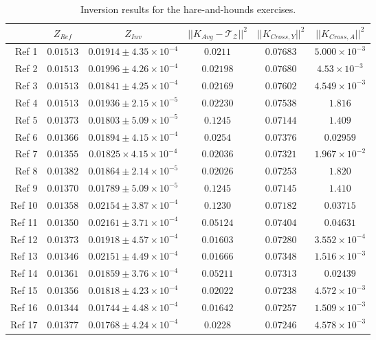 \documentclass[a4paper,fleqn,usenatbib]{mnras}
\begin{document}
\begin{table*}
\caption{Inversion results for the hare-and-hounds exercises.}
\label{tabResInvHH}
  \centering
\begin{tabular}{r | c | c | c | c | c}
\hline
& $Z_{Ref}$  & $Z_{Inv}$ & $\vert \vert K_{Avg}-\mathcal{T}_{\mathcal{Z}} \vert \vert^{2}$ & $\vert \vert K_{Cross,Y} \vert \vert^{2}$ & $\vert \vert K_{Cross,A} \vert \vert^{2}$ \\ \hline
Ref 1 & $0.01513$ & $0.01914\pm 4.35 \times 10^{-4}$ & $0.0211$ & $0.07683$ & $5.000\times 10^{-3}$\\  
Ref 2 & $0.01513$&  $0.01996\pm 4.26 \times 10^{-4}$ & $0.02198$& $0.07680$& $4.53\times 10^{-3}$\\  
Ref 3 & $0.01513$& $0.01841\pm 4.25 \times 10^{-4}$ & $0.02169$& $0.07602$ & $4.549 \times 10^{-3}$ \\
Ref 4 & $0.01513$ & $0.01936 \pm 2.15 \times 10^{-5}$ & $0.02230$ & $0.07538$ & $1.816$\\
Ref 5 & $0.01373$ & $0.01803 \pm 5.09 \times 10^{-5}$ & $0.1245$ & $0.07144$ &$1.409$\\
Ref 6 & $0.01366$ & $0.01894 \pm 4.15 \times 10^{-4}$ &$0.0254$ & $0.07376$ & $0.02959$\\
Ref 7 & $0.01355$ & $0.01825\times 4.15\times 10^{-4}$ &$0.02036$ & $0.07321$ & $1.967\times 10^{-2}$\\
Ref 8 & $0.01382$ & $0.01864 \pm 2.14\times10^{-5}$ &$0.02026$ & $0.07253$ & $1.820$\\
Ref 9 & $0.01370$ & $0.01789 \pm 5.09\times 10^{-5}$ &$0.1245$ & $0.07145$ & $1.410$\\
Ref 10 & $0.01358$ & $0.02154\pm 3.87\times 10^{-4}$ &$0.1230$ & $0.07182$ & $0.03715$\\
Ref 11 & $0.01350$ & $0.02161 \pm 3.71 \times 10^{-4}$ &$0.05124$ & $0.07404$ & $0.04631$\\
Ref 12 & $0.01373$ & $0.01918\pm 4.57 \times 10^{-4}$ &$0.01603$ & $0.07280$ & $3.552\times 10^{-4}$\\
Ref 13 & $0.01346$ & $0.02151 \pm 4.49 \times 10^{-4}$ &$0.01666$ & $0.07348$ & $1.516\times 10^{-3}$\\
Ref 14 & $0.01361$ & $0.01859 \pm 3.76 \times 10^{-4}$ &$0.05211$ & $0.07313$ & $0.02439$\\
Ref 15 & $0.01356$ & $0.01818 \pm 4.23 \times 10^{-4}$ &$0.02022$ & $0.07238$ & $4.572\times 10^{-3}$\\
Ref 16 & $0.01344$ & $0.01744 \pm 4.48\times 10^{-4}$ &$0.01642$ & $0.07257$ & $1.509\times 10^{-3}$\\
Ref 17 & $0.01377$ & $0.01768\pm 4.24\times 10^{-4}$ &$0.0228$ & $0.07246$ & $4.578\times 10^{-3}$\\
\hline
\end{tabular}
\end{table*}
\end{document}
